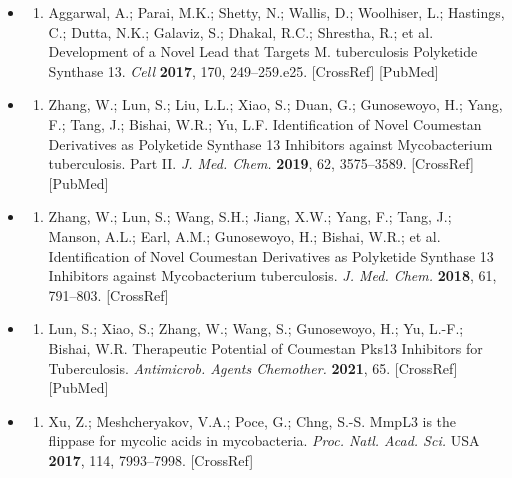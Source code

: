 \documentclass{article}
\begin{document}
\begin{itemize}
\begin{enumerate}
\end{enumerate}

\item \begin{enumerate}
\item 
Aggarwal, A.; Parai, M.K.; Shetty, N.; Wallis, D.; Woolhiser, L.; Hastings, C.; Dutta, N.K.; Galaviz, S.; Dhakal, R.C.; Shrestha, R.; et al. Development of a Novel Lead that Targets M. tuberculosis Polyketide Synthase 13. \textit{Cell} \textbf{2017}, 170, 249–259.e25. [CrossRef] [PubMed]

\end{enumerate}

\item \begin{enumerate}
\item 
Zhang, W.; Lun, S.; Liu, L.L.; Xiao, S.; Duan, G.; Gunosewoyo, H.; Yang, F.; Tang, J.; Bishai, W.R.; Yu, L.F. Identification of Novel Coumestan Derivatives as Polyketide Synthase 13 Inhibitors against Mycobacterium tuberculosis. Part II. \textit{J. Med. Chem.} \textbf{2019}, 62, 3575–3589. [CrossRef] [PubMed]

\end{enumerate}

\item \begin{enumerate}
\item 
Zhang, W.; Lun, S.; Wang, S.H.; Jiang, X.W.; Yang, F.; Tang, J.; Manson, A.L.; Earl, A.M.; Gunosewoyo, H.; Bishai, W.R.; et al. Identification of Novel Coumestan Derivatives as Polyketide Synthase 13 Inhibitors against Mycobacterium tuberculosis. \textit{J. Med. Chem.} \textbf{2018}, 61, 791–803. [CrossRef]

\end{enumerate}

\item \begin{enumerate}
\item 
Lun, S.; Xiao, S.; Zhang, W.; Wang, S.; Gunosewoyo, H.; Yu, L.-F.; Bishai, W.R. Therapeutic Potential of Coumestan Pks13 Inhibitors for Tuberculosis. \textit{Antimicrob. Agents Chemother.} \textbf{2021}, 65. [CrossRef] [PubMed]

\end{enumerate}

\item \begin{enumerate}
\item 
Xu, Z.; Meshcheryakov, V.A.; Poce, G.; Chng, S.-S. MmpL3 is the flippase for mycolic acids in mycobacteria. \textit{Proc. Natl. Acad. Sci.} USA \textbf{2017}, 114, 7993–7998. [CrossRef]


\end{enumerate}
\end{itemize}
\end{document}
